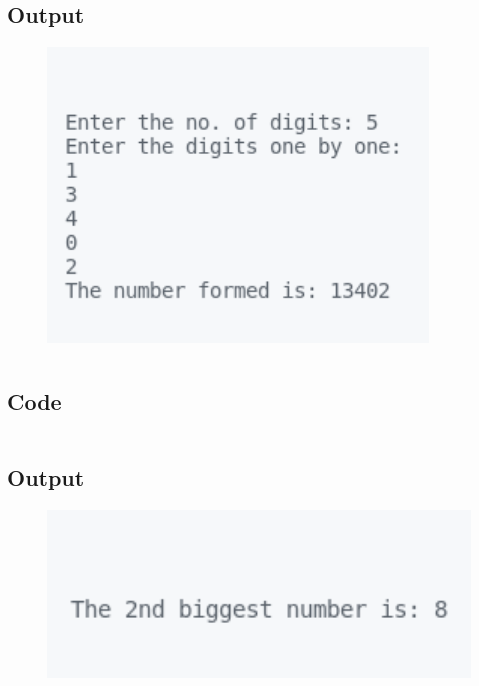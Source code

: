 \documentclass[12pt]{article}
\begin{document}
\subsection{Output}
\begin{figure}[h]
    \centering
    \includegraphics[width=0.9\textwidth]{4.png}
\end{figure}

\newpage
\section{}
\subsection{Code}
\inputminted{c}{q5.c}
\subsection{Output}
\begin{figure}[h]
    \centering
    \includegraphics[width=1.0\textwidth]{5.png}
\end{figure}

\newpage
\section{}
\end{document}
